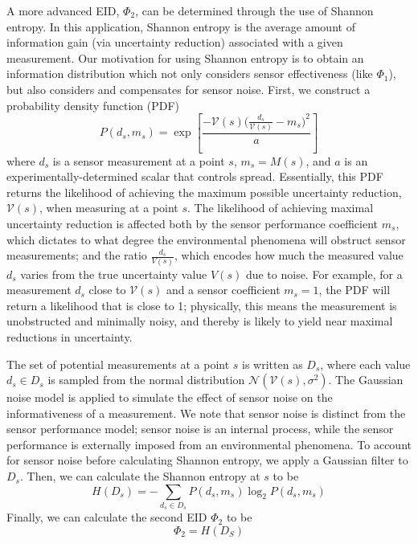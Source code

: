 \documentclass[letterpaper, 10 pt, conference]{ieeeconf}  %
\begin{document}
A more advanced EID, $\Phi_{2}$, can be determined through the use of Shannon entropy. In this application, Shannon entropy is the average amount of information gain (via uncertainty reduction) associated with a given measurement. Our motivation for using Shannon entropy is to obtain an information distribution which not only considers sensor effectiveness (like $\Phi_{1}$), but also considers and compensates for sensor noise. First, we construct a probability density function (PDF)
\begin{equation}
    P(d_s, m_s) = \exp 
    \left[ \frac{-\mathcal{V}(s)\Big(\frac{d_s}{\mathcal{V}(s)}-m_s\Big)^2}{a}\right]
\end{equation}
where $d_s$ is a sensor measurement at a point $s$, $m_s = M(s)$, and $a$ is an experimentally-determined scalar that controls spread. Essentially, this PDF returns the likelihood of achieving the maximum possible uncertainty reduction, $\mathcal{V}(s)$, when measuring at a point $s$. The likelihood of achieving maximal uncertainty reduction is affected both by the sensor performance coefficient $m_s$, which dictates to what degree the environmental phenomena will obstruct sensor measurements; and the ratio $\frac{d_s}{V(s)}$, which encodes how much the measured value $d_s$ varies from the true uncertainty value $V(s)$ due to noise. For example, for a measurement $d_s$ close to $\mathcal{V}(s)$ and a sensor coefficient $m_s=1$, the PDF will return a likelihood that is close to 1; physically, this means the measurement is unobstructed and minimally noisy, and thereby is likely to yield near maximal reductions in uncertainty. 

The set of potential measurements at a point $s$ is written as $D_s$, where each value $d_s \in D_s$ is sampled from the normal distribution $\mathcal{N}(\mathcal{V}(s), \sigma ^2)$. The Gaussian noise model is applied to simulate the effect of sensor noise on the informativeness of a measurement. We note that sensor noise is distinct from the sensor performance model; sensor noise is an internal process, while the sensor performance is externally imposed from an environmental phenomena. To account for sensor noise before calculating Shannon entropy, we apply a Gaussian filter to $D_s$. Then, we can calculate the Shannon entropy at $s$ to be
\begin{equation}
    H(D_s) = -\sum_{d_s\in D_s}P(d_s, m_s)\log_2 P(d_s, m_s)
\end{equation}
Finally, we can calculate the second EID $\Phi_{2}$ to be
\begin{equation}
    \Phi_{2} = H(D_S)
\end{equation}
\end{document}
